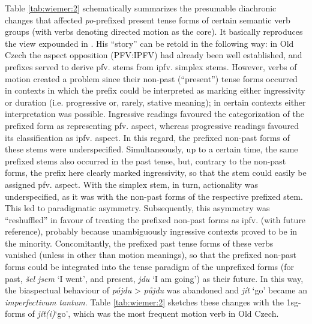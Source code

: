 \documentclass[output=paper,colorlinks,citecolor=brown]{langscibook}
\begin{document}
Table \ref{tab:wiemer:2} schematically summarizes the presumable diachronic changes that affected \textit{po}-prefixed present tense forms of certain semantic verb groups (with verbs denoting directed motion as the core). It basically reproduces the view expounded in \citet[277]{Němec2009b}. His “story” can be retold in the following way: in Old Czech the aspect opposition (PFV:IPFV) had already been well established, and prefixes served to derive pfv. stems from ipfv. simplex stems. However, verbs of motion created a problem since their non-past (“present”) tense forms occurred in contexts in which the prefix could be interpreted as marking either ingressivity or duration (i.e. progressive or, rarely, stative meaning); in certain contexts either interpretation was possible. Ingressive readings favoured the categorization of the prefixed form as representing pfv. aspect, whereas progressive readings favoured its classification as ipfv. aspect. In this regard, the prefixed non-past forms of these stems were underspecified. Simultaneously, up to a certain time, the same prefixed stems also occurred in the past tense, but, contrary to the non-past forms, the prefix here clearly marked ingressivity, so that the stem could easily be assigned pfv. aspect. With the simplex stem, in turn, actionality was underspecified, as it was with the non-past forms of the respective prefixed stem. This led to paradigmatic asymmetry. Subsequently, this asymmetry was “reshuffled” in favour of treating the prefixed non-past forms as ipfv. (with future reference), probably because unambiguously ingressive contexts proved to be in the minority. Concomitantly, the prefixed past tense forms of these verbs vanished (unless in other than motion meanings), so that the prefixed non-past forms could be integrated into the tense paradigm of the unprefixed forms (for past, \textit{šel jsem }‘I went’, and present, \textit{jdu }‘I am going’) as their future. In this way, the biaspectual behaviour of \textit{pójdu} > \textit{půjdu} was abandoned and \textit{jít} ‘go’ became an \textit{imperfectivum tantum}. Table \ref{tab:wiemer:2} sketches these changes with the 1sg-forms of \textit{jít(i)}‘go’, which was the most frequent motion verb in Old Czech.
\end{document}
